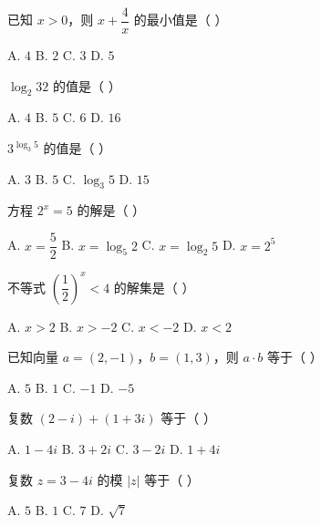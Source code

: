 \documentclass[11pt, a4paper]{article}
\begin{document}
\begin{baitap}[36]
已知 $x > 0$，则 $x + \dfrac{4}{x}$ 的最小值是（ ）
\par\vspace{3pt}
\noindent A. $4$ \quad B. $2$ \quad C. $3$ \quad D. $5$
\end{baitap}

\begin{baitap}[37]
$\log_2 32$ 的值是（ ）
\par\vspace{3pt}
\noindent A. $4$ \quad B. $5$ \quad C. $6$ \quad D. $16$
\end{baitap}

\begin{baitap}[38]
$3^{\log_3 5}$ 的值是（ ）
\par\vspace{3pt}
\noindent A. $3$ \quad B. $5$ \quad C. $\log_3 5$ \quad D. $15$
\end{baitap}

\begin{baitap}[39]
方程 $2^x = 5$ 的解是（ ）
\par\vspace{3pt}
\noindent A. $x = \dfrac{5}{2}$ \quad B. $x = \log_5 2$ \quad C. $x = \log_2 5$ \quad D. $x = 2^5$
\end{baitap}

\begin{baitap}[40]
不等式 $\left(\dfrac{1}{2}\right)^x < 4$ 的解集是（ ）
\par\vspace{3pt}
\noindent A. $x > 2$ \quad B. $x > -2$ \quad C. $x < -2$ \quad D. $x < 2$
\end{baitap}

\begin{baitap}[41]
已知向量 $a = (2, -1)$，$b = (1, 3)$，则 $a \cdot b$ 等于（ ）
\par\vspace{3pt}
\noindent A. $5$ \quad B. $1$ \quad C. $-1$ \quad D. $-5$
\end{baitap}

\begin{baitap}[42]
复数 $(2 - i) + (1 + 3i)$ 等于（ ）
\par\vspace{3pt}
\noindent A. $1 - 4i$ \quad B. $3 + 2i$ \quad C. $3 - 2i$ \quad D. $1 + 4i$
\end{baitap}

\begin{baitap}[43]
复数 $z = 3 - 4i$ 的模 $\lvert z \rvert$ 等于（ ）
\par\vspace{3pt}
\noindent A. $5$ \quad B. $1$ \quad C. $7$ \quad D. $\sqrt{7}$
\end{baitap}
\end{document}

